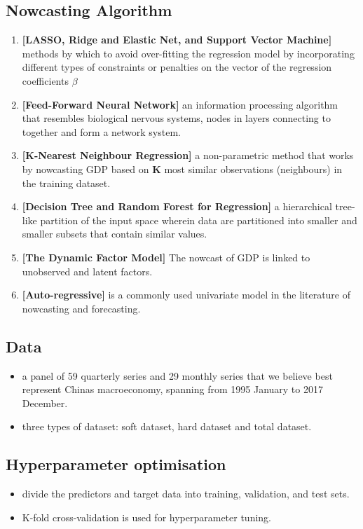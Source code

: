 \documentclass[thesis]{hmcposter}
\begin{document}
\begin{poster}
\subsection{Nowcasting Algorithm}%
\begin{enumerate}
    \item \textbf{[LASSO, Ridge and Elastic Net, and Support Vector Machine]} methods by which to avoid over-fitting the regression model by incorporating different types of constraints or penalties on the vector of the regression coefficients $\beta$
    \item \textbf{[Feed-Forward Neural Network]} an information processing algorithm that resembles biological nervous systems, nodes in layers connecting to together and form a network system.
    \item \textbf{[K-Nearest Neighbour Regression]} a non-parametric method that works by nowcasting GDP based on $\mathbf{K}$ most similar observations (neighbours) in the training dataset.
    \item \textbf{[Decision Tree and Random Forest for Regression]} a hierarchical tree-like partition of the input space wherein data are partitioned into smaller and smaller subsets that contain similar values. 
    \item \textbf{[The Dynamic Factor Model]} The nowcast of GDP is linked to unobserved and latent factors.
    \item \textbf{[Auto-regressive]} is a commonly used univariate model in the literature of nowcasting and forecasting.
\end{enumerate}
\subsection{Data}
\begin{itemize}
    \item a panel of 59 quarterly series and 29 monthly series that we believe best represent Chinas macroeconomy, spanning from 1995 January to 2017 December.
    \item three types of dataset: soft dataset, hard dataset and total dataset.
\end{itemize}
\subsection{Hyperparameter optimisation}
\begin{itemize}
    \item divide the predictors and target data into training, validation, and test sets. 
    \item K-fold cross-validation is used for hyperparameter tuning.
\end{itemize}


\end{poster}
\end{document}
